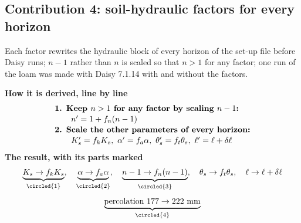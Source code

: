 \subsection{Contribution 4: soil-hydraulic factors for every horizon}
\begin{derivation}
Each factor rewrites the hydraulic block of every horizon of the set-up file before Daisy runs; $n-1$ rather than $n$ is scaled so that $n>1$ for any factor; one run of the loam was made with Daisy 7.1.14 with and without the factors.
\end{derivation}
\begin{keyresult}
\begin{pencil}
{\small\noindent\textbf{How it is derived, line by line}
\[\begin{array}{@{}l@{}}\textbf{1. Keep } n>1\textbf{ for any factor by scaling } n-1\textbf{:}\\[1pt]
\qquad n'=1+f_n(n-1)\\[1pt]
\textbf{2. Scale the other parameters of every horizon:}\\[1pt]
\qquad K_s'=f_kK_s,\ \alpha'=f_a\alpha,\ \theta_s'=f_t\theta_s,\ \ell'=\ell+\delta\ell
\end{array}\]}
\noindent\textbf{The result, with its parts marked}
\[\underbrace{K_s\to f_kK_s}_{\circled{1}},\quad \underbrace{\alpha\to f_a\alpha}_{\circled{2}},\quad \underbrace{n-1\to f_n(n-1)}_{\circled{3}},\quad \theta_s\to f_t\theta_s,\quad \ell\to\ell+\delta\ell\]
\[\underbrace{\text{percolation }177\to222\ \mathrm{mm}}_{\circled{4}}\]
\end{pencil}
\end{keyresult}
\begin{pins}
\end{pins}

